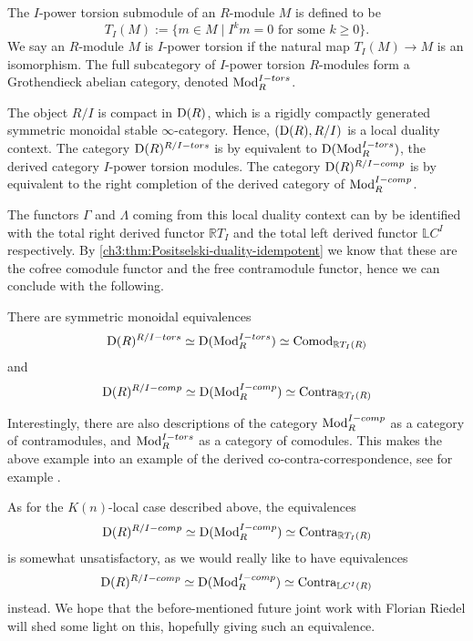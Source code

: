 The $I$-power torsion submodule of an $R$-module $M$ is defined to be 
\[T_I(M) := \{m \in M \mid I^k m = 0 \text{ for some } k\geq 0\}.\]
We say an $R$-module $M$ is $I$-power torsion if the natural map $T_I(M) \to M$ is an isomorphism. The full subcategory of $I$-power torsion $R$-modules form a Grothendieck abelian category, denoted $\mathrm{Mod}_R^{I-tors}$. 

The object $R/I$ is compact in $\mathrm{D}(R)$, which is a rigidly compactly generated symmetric monoidal stable $\infty$-category. Hence, $(\mathrm{D}(R), R/I)$ is a local duality context. The category $\mathrm{D}(R)^{R/I-tors}$ is by \cite[3.7(2)]{barthel-heard-valenzuela_2020} equivalent to $\mathrm{D}(\mathrm{Mod}_R^{I-tors})$, the derived category $I$-power torsion modules. The category $\mathrm{D}(R)^{R/I-comp}$ is by \cite[3.7(1)]{barthel-heard-valenzuela_2020} equivalent to the right completion of the derived category of $\mathrm{Mod}_R^{I-comp}$. 

The functors $\Gamma$ and $\Lambda$ coming from this local duality context can by \cite[3.16]{barthel-heard-valenzuela_2018} be identified with the total right derived functor $\mathbb{R}T_I$ and the total left derived functor $\mathbb{L}C^I$ respectively. By \cref{ch3:thm:Positselski-duality-idempotent} we know that these are the cofree comodule functor and the free contramodule functor, hence we can conclude with the following. 

\begin{proposition}
    There are symmetric monoidal equivalences
    \[\mathrm{D}(R)^{R/I-tors}\simeq \mathrm{D}(\mathrm{Mod}_R^{I-tors})\simeq \mathrm{Comod}_{\mathbb{R}T_I(R)}\]
    and 
    \[\mathrm{D}(R)^{R/I-comp}\simeq \mathrm{D}(\mathrm{Mod}_R^{I-comp})\simeq \mathrm{Contra}_{\mathbb{R}T_I(R)}\]
\end{proposition}

Interestingly, there are also descriptions of the category $\mathrm{Mod}_R^{I-comp}$ as a category of contramodules, and $\mathrm{Mod}_R^{I-tors}$ as a category of comodules. This makes the above example into an example of the derived co-contra-correspondence, see for example \cite{positselski_2016}. 

As for the $K(n)$-local case described above, the equivalences
\[\mathrm{D}(R)^{R/I-comp}\simeq \mathrm{D}(\mathrm{Mod}_R^{I-comp})\simeq \mathrm{Contra}_{\mathbb{R}T_I(R)}\]
is somewhat unsatisfactory, as we would really like to have equivalences 
\[\mathrm{D}(R)^{R/I-comp}\simeq \mathrm{D}(\mathrm{Mod}_R^{I-comp})\simeq \mathrm{Contra}_{\mathbb{L}C^I(R)}\]
instead. We hope that the before-mentioned future joint work with Florian Riedel will shed some light on this, hopefully giving such an equivalence.  